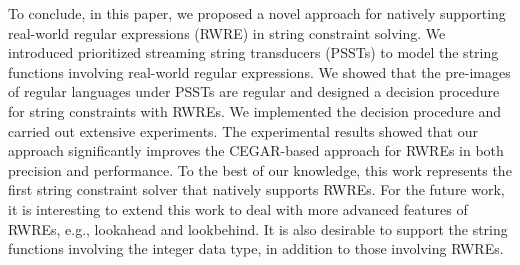 To conclude, in this paper, we proposed a novel approach for natively supporting real-world regular expressions (RWRE) in string constraint solving. We introduced prioritized streaming string transducers (PSSTs) to  model the string functions involving real-world regular expressions. We showed that the pre-images of regular languages under PSSTs are regular and designed a decision procedure for string constraints with RWREs. We implemented the decision procedure and carried out extensive experiments. The experimental results showed that our approach significantly improves the CEGAR-based approach for RWREs in both precision and performance. To the best of our knowledge, this work represents the first string constraint solver that natively supports RWREs. For the future work, it is interesting to extend this work to deal with more advanced features of RWREs, e.g., lookahead and lookbehind. It is also desirable to support the string functions involving the integer data type, in addition to those involving RWREs.
